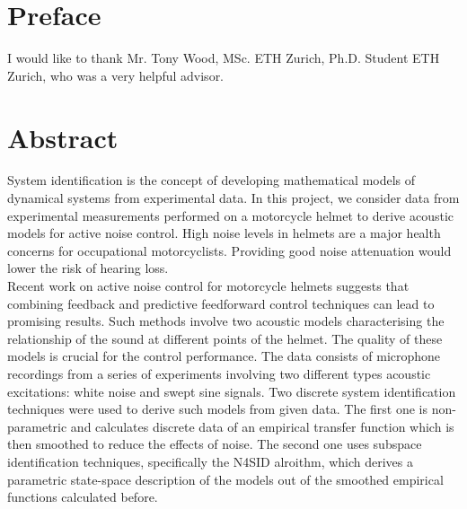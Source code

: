


 

\chapter*{Preface}

I would like to thank Mr. Tony Wood, MSc. ETH Zurich, Ph.D. Student ETH Zurich, who was a very helpful advisor.

 \cleardoublepage





 \setcounter{tocdepth}{2}
 \tableofcontents

 \cleardoublepage


%
%
%
 \cleardoublepage

\chapter*{Abstract}
System identification is the concept of developing mathematical models of dynamical systems from experimental data. In this project, we consider data from experimental measurements performed on a motorcycle helmet to derive acoustic models for active noise control. High noise levels in helmets are a major health concerns for occupational motorcyclists. Providing good noise attenuation would lower the risk of hearing loss.\\

Recent work on active noise control for motorcycle helmets suggests that combining feedback and predictive feedforward control techniques can lead to promising results. Such methods involve two acoustic models characterising the relationship of the sound at different points of the  helmet. The quality of these models is crucial for the control performance. The data consists of microphone recordings from a series of experiments involving two different types acoustic excitations: white noise and swept sine signals. Two discrete system identification techniques were used to derive such models from given data. The first one is non-parametric and calculates discrete data of an empirical transfer function which is then smoothed to reduce the effects of noise. The second one uses subspace identification techniques, specifically the N4SID alroithm, which derives a parametric state-space description of the models out of the smoothed empirical functions calculated before. 

